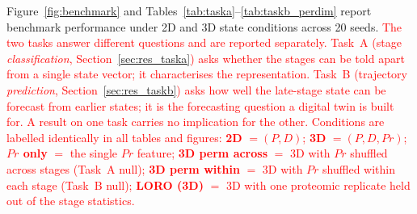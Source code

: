\documentclass[5p,times,twocolumn]{elsarticle}
\newcommand{\rtag}[1]{}
\newcommand{\rev}[2]{\rtag{#1}\textcolor{red}{#2}}
\newcommand{\lang}[1]{\textcolor{red}{#1}}
\begin{document}
Figure~\ref{fig:benchmark} and
Tables~\ref{tab:taska}--\ref{tab:taskb_perdim} report benchmark
performance under 2D and 3D state conditions across 20 seeds.
\rev{R2.23}{The two tasks answer different questions and are
  reported separately. Task~A (stage \textit{classification},
  Section~\ref{sec:res_taska}) asks whether the stages can be told
  apart from a single state vector; it characterises the
  representation. Task~B (trajectory \textit{prediction},
  Section~\ref{sec:res_taskb}) asks how well the late-stage state
  can be forecast from earlier states; it is the forecasting
  question a digital twin is built for. A result on one task
  carries no implication for the other.}
\rev{R1.7}{Conditions are labelled identically in all tables and
  figures: \textbf{2D} $=(P,D)$; \textbf{3D} $=(P,D,Pr)$;
  \textbf{$Pr$ only} $=$ the single $Pr$ feature;
  \textbf{3D perm across} $=$ 3D with $Pr$ shuffled across stages
  (Task~A null); \textbf{3D perm within} $=$ 3D with $Pr$ shuffled
  within each stage (Task~B null); \textbf{LORO (3D)} $=$ 3D with
  one proteomic replicate held out of the stage statistics.}

\begin{table}[!htbp]
  \caption{%
    Task A --- stage separability (3-class macro F1,
    $n = 30$ held-out trajectories).
    Mean $\pm$ std across 20 seeds.
    The \texttt{perm\_across} null collapses 3D performance back
    to $\sim$2D, confirming \lang{that} the lift \lang{reflects} real proteomic-stage
    signal rather than added model capacity.
    The $Pr$-only column locates the signal on the single
    monotonic $Pr$ axis; the LORO column (each \lang{canonical} CTRL
    replicate held out from the stage mean) tests generalisation
    beyond replicates that contributed to the stage definition.
    \rev{R1.7,R1.8}{Because $Pr$ only equals 3D, the 3D score is
      evidence of stage separability on the $Pr$ axis, not of model
      superiority. LORO is mean $\pm$ s.d.\ over the 7 held-out
      replicates, not over seeds.}}
  \label{tab:taska}
  \centering
\end{table}
\end{document}
